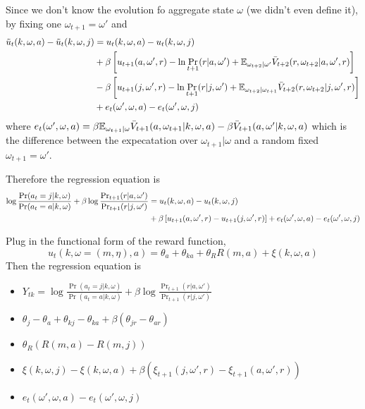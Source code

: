 \documentclass[12pt]{article}[margin=1in]
\begin{document}
Since we don't know the evolution fo aggregate state $\omega$ (we didn't even define it), by fixing one $\omega_{t+1}=\omega'$ and
\begin{equation}
    \begin{split}
        \tilde{u}_t(k, \omega, a) - \tilde{u}_t(k, \omega, j) & = u_t(k, \omega, a) - u_t(k, \omega, j)                                                                                                        \\
                                                              & + \beta\left[u_{t+1}(a, \omega',r) -\ln \Pr_{t+1}(r | a, \omega') + \mathbb{E}_{\omega_{t+2}|\omega'}\bar{V}_{t+2}(r, \omega_{t+2}| a, \omega', r)  \right]   \\
                                                              & -\beta \left[u_{t+1}(j, \omega',r) -\ln \Pr_{t+1}(r| j, \omega') + \mathbb{E}_{\omega_{t+2}|\omega_{t+1}}\bar{V}_{t+2}(r, \omega_{t+2}| j, \omega', r)\right] \\
                                                              & + e_t(\omega',\omega, a) -e_t(\omega',\omega, j) 
    \end{split}
\end{equation}
where $e_t(\omega',\omega, a) = \beta \mathbb{E}_{\omega_{t+1}|\omega} \bar{V}_{t+1}(a, \omega_{t+1}| k, \omega, a)  - \beta \bar{V}_{t+1}(a, \omega'| k, \omega, a)$ which is the difference between the expecatation over $\omega_{t+1}|\omega$ and a random fixed $\omega_{t+1}=\omega'$.

Therefore the regression equation is 
\begin{equation}
    \begin{split}
        \log \frac{\Pr(a_t = j | k, \omega)}{\Pr(a_t = a | k, \omega)} + \beta \log \frac{\Pr_{t+1}(r | a, \omega')}{\Pr_{t+1}(r | j, \omega')} & = u_t(k, \omega, a) - u_t(k, \omega, j) \\ &+ \beta\left[u_{t+1}(a, \omega',r) - u_{t+1}(j, \omega',r)\right] + e_t(\omega',\omega, a) - e_t(\omega',\omega, j)
    \end{split}
\end{equation}

Plug in the functional form of the reward function,
$$ u_t(k, \omega=(m,\eta), a) = \theta_a+\theta_{ka}+\theta_R R(m,a) + \xi(k, \omega, a)$$
Then the regression equation is 
\begin{itemize}
    \item $ Y_{tk}  = \log \frac{\Pr(a_t = j | k, \omega)}{\Pr(a_t = a | k, \omega)} + \beta \log \frac{\Pr_{t+1}(r | a, \omega')}{\Pr_{t+1}(r | j, \omega')}$
    \item $\theta_j-\theta_a + \theta_{kj} - \theta_{ka} + \beta(\theta_{jr}-\theta_{ar})$
    \item $\theta_R(R(m,a) - R(m,j))$
    \item $\xi(k, \omega,j) - \xi(k, \omega,a) + \beta(\xi_{t+1}(j, \omega',r) - \xi_{t+1}(a, \omega',r))$
    \item $e_t(\omega',\omega, a) - e_t(\omega',\omega, j)$
\end{itemize}
\end{document}
